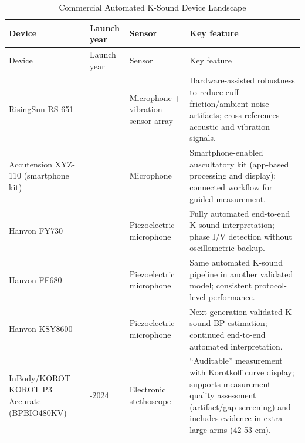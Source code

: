 \documentclass[
  12pt,
  letterpaper,
  openany,
  oneside]{book}
\begin{document}
\begin{longtable}[]{@{}
  >{\raggedright\arraybackslash}p{}
  >{\raggedright\arraybackslash}p{}
  >{\raggedright\arraybackslash}p{}
  >{\raggedright\arraybackslash}p{}@{}}
\caption{Commercial Automated K-Sound Device
Landscape}\label{tbl-ksound-devices}\tabularnewline
\toprule\noalign{}
\begin{minipage}[b]{\linewidth}\raggedright
Device
\end{minipage} & \begin{minipage}[b]{\linewidth}\raggedright
Launch year
\end{minipage} & \begin{minipage}[b]{\linewidth}\raggedright
Sensor
\end{minipage} & \begin{minipage}[b]{\linewidth}\raggedright
Key feature
\end{minipage} \\
\midrule\noalign{}
\endfirsthead
\toprule\noalign{}
\begin{minipage}[b]{\linewidth}\raggedright
Device
\end{minipage} & \begin{minipage}[b]{\linewidth}\raggedright
Launch year
\end{minipage} & \begin{minipage}[b]{\linewidth}\raggedright
Sensor
\end{minipage} & \begin{minipage}[b]{\linewidth}\raggedright
Key feature
\end{minipage} \\
\midrule\noalign{}
\endhead
\bottomrule\noalign{}
\endlastfoot
RisingSun RS-651 & 2016 & Microphone + vibration sensor array &
Hardware-assisted robustness to reduce cuff-friction/ambient-noise
artifacts; cross-references acoustic and vibration signals. \\
Accutension XYZ-110 (smartphone kit) & 2017 & Microphone &
Smartphone-enabled auscultatory kit (app-based processing and display);
connected workflow for guided measurement. \\
Hanvon FY730 & 2025 & Piezoelectric microphone & Fully automated
end-to-end K-sound interpretation; phase I/V detection without
oscillometric backup. \\
Hanvon FF680 & 2025 & Piezoelectric microphone & Same automated K-sound
pipeline in another validated model; consistent protocol-level
performance. \\
Hanvon KSY8600 & 2026 & Piezoelectric microphone & Next-generation
validated K-sound BP estimation; continued end-to-end automated
interpretation. \\
InBody/KOROT KOROT P3 Accurate (BPBIO480KV) & 2023-2024 & Electronic
stethoscope & ``Auditable'' measurement with Korotkoff curve display;
supports measurement quality assessment (artifact/gap screening) and
includes evidence in extra-large arms (42-53 cm). \\
\end{longtable}
\end{document}
